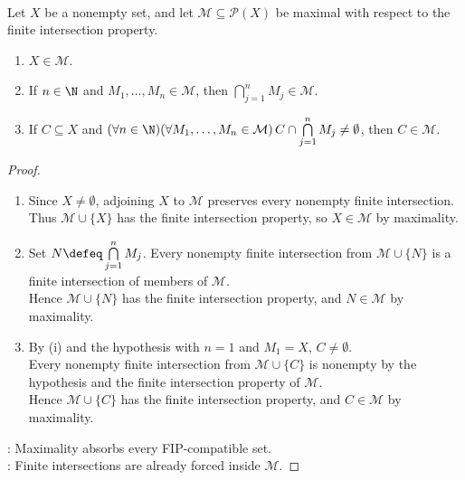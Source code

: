 \begin{lemma} \label{lem:maximal-fip-family-properties} \\
Let $X$ be a nonempty set, and let $\mathcal{M}\subseteq\mathcal{P}(X)$ be maximal with respect to the finite intersection property.
\begin{enumerate}[label=(\roman*)]
\setlength{\itemsep}{0pt}
\item $X\in\mathcal{M}$.
\item If $n\in\N$ and $M_1,\ldots,M_n\in\mathcal{M}$, then $\bigcap\limits_{j=1}^nM_j\in\mathcal{M}$.
\item If $C\subseteq X$ and $(\forall n\in\N)(\forall M_1,\ldots,M_n\in\mathcal{M})\,C\cap\bigcap\limits_{j=1}^nM_j\neq\emptyset$, then $C\in\mathcal{M}$.
\end{enumerate}
\begin{proof}
\begin{enumerate}[label=(\roman*)]
\setlength{\itemsep}{0pt}
\item[$(i)$] Since $X\neq\emptyset$, adjoining $X$ to $\mathcal{M}$ preserves every nonempty finite intersection.\\
Thus $\mathcal{M}\cup\{X\}$ has the finite intersection property, so $X\in\mathcal{M}$ by maximality.
\item[$(ii)$] Set $N\defeq\bigcap\limits_{j=1}^nM_j$. Every nonempty finite intersection from $\mathcal{M}\cup\{N\}$ is a finite intersection of members of $\mathcal{M}$.\\
Hence $\mathcal{M}\cup\{N\}$ has the finite intersection property, and $N\in\mathcal{M}$ by maximality.
\item[$(iii)$] By (i) and the hypothesis with $n=1$ and $M_1=X$, $C\neq\emptyset$.\\
Every nonempty finite intersection from $\mathcal{M}\cup\{C\}$ is nonempty by the hypothesis and the finite intersection property of $\mathcal{M}$.\\
Hence $\mathcal{M}\cup\{C\}$ has the finite intersection property, and $C\in\mathcal{M}$ by maximality.
\end{enumerate}
: Maximality absorbs every FIP-compatible set.\\
: Finite intersections are already forced inside $\mathcal{M}$.
\end{proof}
\end{lemma}


